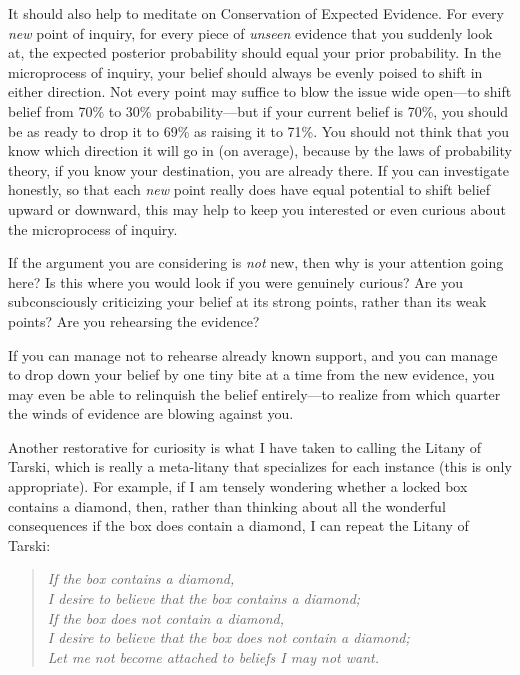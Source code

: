 {
 It should also help to meditate on Conservation of Expected
Evidence. For every \textit{new} point of inquiry, for every piece of
\textit{unseen} evidence that you suddenly look at, the expected
posterior probability should equal your prior probability. In the
microprocess of inquiry, your belief should always be evenly poised to
shift in either direction. Not every point may suffice to blow the
issue wide open---to shift belief from 70\% to 30\% probability---but
if your current belief is 70\%, you should be as ready to drop it to
69\% as raising it to 71\%. You should not think that you know which
direction it will go in (on average), because by the laws of
probability theory, if you know your destination, you are already
there. If you can investigate honestly, so that each \textit{new} point
really does have equal potential to shift belief upward or downward,
this may help to keep you interested or even curious about the
microprocess of inquiry.}

{
 If the argument you are considering is \textit{not} new, then why
is your attention going here? Is this where you would look if you were
genuinely curious? Are you subconsciously criticizing your belief at
its strong points, rather than its weak points? Are you rehearsing the
evidence?}

{
 If you can manage not to rehearse already known support, and you
can manage to drop down your belief by one tiny bite at a time from the
new evidence, you may even be able to relinquish the belief
entirely---to realize from which quarter the winds of evidence are
blowing against you.}

{
 Another restorative for curiosity is what I have taken to calling
the Litany of Tarski, which is really a meta-litany that specializes
for each instance (this is only appropriate). For example, if I am
tensely wondering whether a locked box contains a diamond, then, rather
than thinking about all the wonderful consequences if the box does
contain a diamond, I can repeat the Litany of Tarski:}
\label{litany_of_tarski}

\begin{verse}
\textit{If the box contains a diamond,}\\
\textit{ I desire to believe that the box contains a diamond;}\\
\textit{ If the box does not contain a diamond,}\\
\textit{ I desire to believe that the box does not contain a
diamond;}\\
\textit{ Let me not become attached to beliefs I may not want.}\\
\end{verse}

